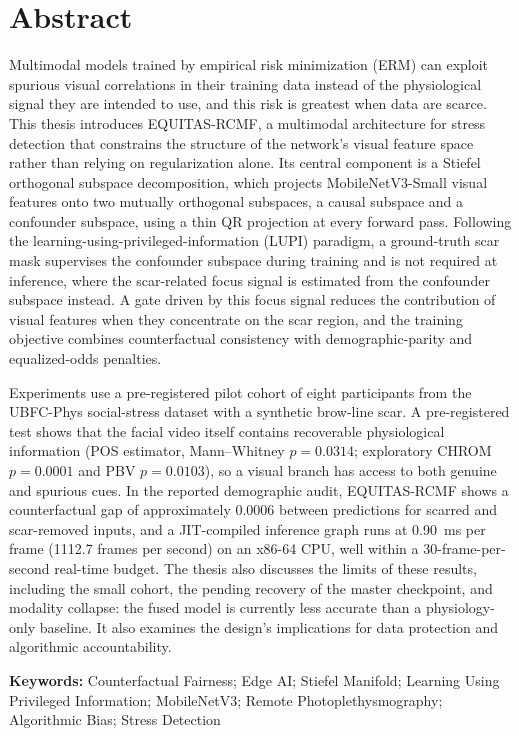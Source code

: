\section*{Abstract}
Multimodal models trained by empirical risk minimization (ERM) can exploit spurious visual correlations in their training data instead of the physiological signal they are intended to use, and this risk is greatest when data are scarce. This thesis introduces EQUITAS-RCMF, a multimodal architecture for stress detection that constrains the structure of the network's visual feature space rather than relying on regularization alone. Its central component is a Stiefel orthogonal subspace decomposition, which projects MobileNetV3-Small visual features onto two mutually orthogonal subspaces, a causal subspace and a confounder subspace, using a thin QR projection at every forward pass. Following the learning-using-privileged-information (LUPI) paradigm, a ground-truth scar mask supervises the confounder subspace during training and is not required at inference, where the scar-related focus signal is estimated from the confounder subspace instead. A gate driven by this focus signal reduces the contribution of visual features when they concentrate on the scar region, and the training objective combines counterfactual consistency with demographic-parity and equalized-odds penalties.

Experiments use a pre-registered pilot cohort of eight participants from the UBFC-Phys social-stress dataset with a synthetic brow-line scar. A pre-registered test shows that the facial video itself contains recoverable physiological information (POS estimator, Mann--Whitney $p = 0.0314$; exploratory CHROM $p = 0.0001$ and PBV $p = 0.0103$), so a visual branch has access to both genuine and spurious cues. In the reported demographic audit, EQUITAS-RCMF shows a counterfactual gap of approximately $0.0006$ between predictions for scarred and scar-removed inputs, and a JIT-compiled inference graph runs at 0.90~ms per frame (1112.7 frames per second) on an x86-64 CPU, well within a 30-frame-per-second real-time budget. The thesis also discusses the limits of these results, including the small cohort, the pending recovery of the master checkpoint, and modality collapse: the fused model is currently less accurate than a physiology-only baseline. It also examines the design's implications for data protection and algorithmic accountability.

\vspace{0.75cm}

\noindent\textbf{Keywords:} Counterfactual Fairness; Edge AI; Stiefel Manifold; Learning Using Privileged Information; MobileNetV3; Remote Photoplethysmography; Algorithmic Bias; Stress Detection
